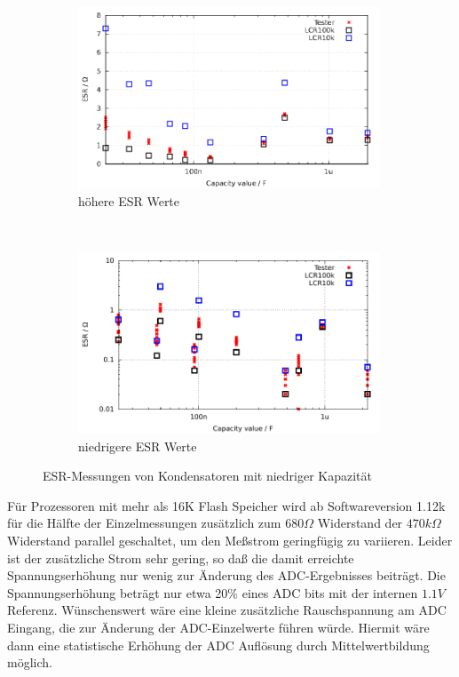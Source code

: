 \begin{figure}[H]
  \begin{subfigure}[b]{9cm}
    \centering
    \includegraphics[width=9cm]{../GNU/Cesr_22n.pdf}
    \caption{höhere ESR Werte}
  \end{subfigure}
  ~
  \begin{subfigure}[b]{9cm}
    \centering
    \includegraphics[width=9cm]{../GNU/Cesr_22n_low.pdf}
    \caption{niedrigere ESR Werte}
  \end{subfigure}
  \caption{ESR-Messungen von Kondensatoren mit niedriger Kapazität}
  \label{pic:Cesr_22n}
\end{figure}
 
Für Prozessoren mit mehr als 16K Flash Speicher wird ab Softwareversion 1.12k für die Hälfte der Einzelmessungen
zusätzlich zum \(680\Omega\) Widerstand der \(470k\Omega\) Widerstand parallel geschaltet, um den Meßstrom geringfügig zu variieren.
Leider ist der zusätzliche Strom sehr gering, so daß die damit erreichte Spannungserhöhung nur wenig zur Änderung
des ADC-Ergebnisses beiträgt.
Die Spannungserhöhung beträgt nur etwa 20\% eines ADC bits mit der internen \(1.1V\) Referenz.
Wünschenswert wäre eine kleine zusätzliche Rauschspannung am ADC Eingang, die zur Änderung der ADC-Einzelwerte führen würde.
Hiermit wäre dann eine statistische Erhöhung der ADC Auflösung durch Mittelwertbildung möglich. 


